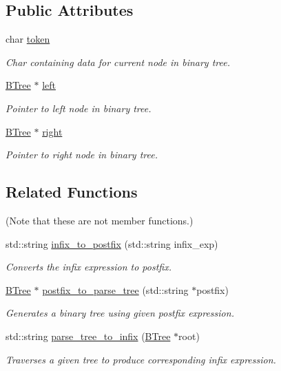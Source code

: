 \subsection*{Public Attributes}
\begin{DoxyCompactItemize}
\item 
char \mbox{\hyperlink{classBTree_a3d5016b19ab621d5c61cf633ec012a72}{token}}
\begin{DoxyCompactList}\small\item\em Char containing data for current node in binary tree. \end{DoxyCompactList}\item 
\mbox{\hyperlink{classBTree}{B\+Tree}} $\ast$ \mbox{\hyperlink{classBTree_ad7e7d928a099c40fbd0d323f76d7cf18}{left}}
\begin{DoxyCompactList}\small\item\em Pointer to left node in binary tree. \end{DoxyCompactList}\item 
\mbox{\hyperlink{classBTree}{B\+Tree}} $\ast$ \mbox{\hyperlink{classBTree_af95770a535a9278b37fd73d7b6ae7f5e}{right}}
\begin{DoxyCompactList}\small\item\em Pointer to right node in binary tree. \end{DoxyCompactList}\end{DoxyCompactItemize}
\subsection*{Related Functions}
(Note that these are not member functions.) \begin{DoxyCompactItemize}
\item 
std\+::string \mbox{\hyperlink{classBTree_a2dbc497c79c44fc43579cedee34296e8}{infix\+\_\+to\+\_\+postfix}} (std\+::string infix\+\_\+exp)
\begin{DoxyCompactList}\small\item\em Converts the infix expression to postfix. \end{DoxyCompactList}\item 
\mbox{\hyperlink{classBTree}{B\+Tree}} $\ast$ \mbox{\hyperlink{classBTree_a628ffca8bc269400217fa849038b6684}{postfix\+\_\+to\+\_\+parse\+\_\+tree}} (std\+::string $\ast$postfix)
\begin{DoxyCompactList}\small\item\em Generates a binary tree using given postfix expression. \end{DoxyCompactList}\item 
std\+::string \mbox{\hyperlink{classBTree_a9804f1d5620990cac8ac016f30cb6f4f}{parse\+\_\+tree\+\_\+to\+\_\+infix}} (\mbox{\hyperlink{classBTree}{B\+Tree}} $\ast$root)
\begin{DoxyCompactList}\small\item\em Traverses a given tree to produce corresponding infix expression. \end{DoxyCompactList}\end{DoxyCompactItemize}


